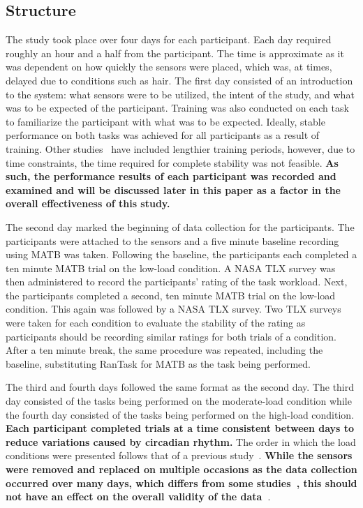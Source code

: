 \documentclass[11pt]{article}
\begin{document}
	\subsection{Structure} %
	The study took place over four days for each participant. Each day required roughly an hour and a half from the participant. The time is approximate as it was dependent on how quickly the sensors were placed, which was, at times, delayed due to conditions such as hair. The first day consisted of an introduction to the system: what sensors were to be utilized, the intent of the study, and what was to be expected of the participant. Training was also conducted on each task to familiarize the participant with what was to be expected. Ideally, stable performance on both tasks was achieved for all participants as a result of training. Other studies~\cite{Wilson} have included lengthier training periods, however, due to time constraints, the time required for complete stability was not feasible. 
	{\bf As such, the performance results of each participant was recorded and examined and will be discussed later in this paper as a factor in the overall effectiveness of this study. } %
	
	The second day marked the beginning of data collection for the participants. The participants were attached to the sensors and a five minute baseline recording using MATB was taken. Following the baseline, the participants each completed a ten minute MATB trial on the low-load condition. A NASA TLX survey was then administered to record the participants' rating of the task workload. Next, the participants completed a second, ten minute MATB trial on the low-load condition. This again was followed by a NASA TLX survey. Two TLX surveys were taken for each condition to evaluate the stability of the rating as participants should be recording similar ratings for both trials of a condition. After a ten minute break, the same procedure was repeated, including the baseline, substituting RanTask for MATB as the task being performed.
	
	The third and fourth days followed the same format as the second day. The third day consisted of the tasks being performed on the moderate-load condition while the fourth day consisted of the tasks being performed on the high-load condition. {\bf Each participant completed trials at a time consistent between days to reduce variations caused by circadian rhythm.} The order in which the load conditions were presented follows that of a previous study~\cite{Wilson}. {\bf While the sensors were removed and replaced on multiple occasions as the data collection occurred over many days, which differs from some studies~\cite{Wilson, ...}, this should not have an effect on the overall validity of the data~\cite{...}}. 
\end{document}
